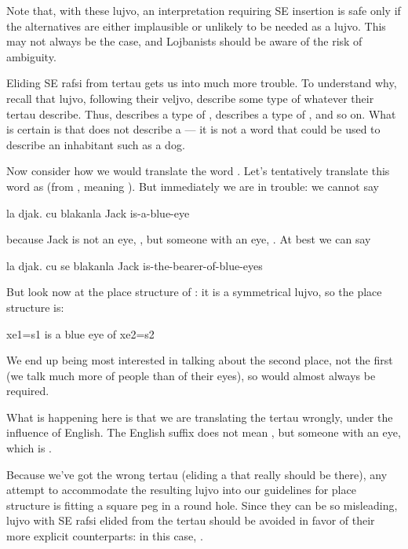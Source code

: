 Note that, with these lujvo, an interpretation requiring SE
    insertion is safe only if the alternatives are either
    implausible or unlikely to be needed as a lujvo. This may not
    always be the case, and Lojbanists should be aware of the risk
    of ambiguity.



Eliding SE rafsi from tertau gets us into much more trouble.
    To understand why, recall that lujvo, following their veljvo,
    describe some type of whatever their tertau describe. Thus,
     describes a type of ,  describes
    a type of , and so on. What is certain is that
     does not describe a  --- it is not a
    word that could be used to describe an inhabitant such as a
    dog.

Now consider how we would translate the word .
    Let's tentatively translate this word as  (from
    , meaning ). But immediately we are
    in trouble: we cannot say
\begin{example}
la djak. cu blakanla\n
Jack is-a-blue-eye
\end{example}

{\noindent}because Jack is not an eye, , but someone with an eye,
    . At best we can say
\begin{example}
la djak. cu se blakanla\n
Jack is-the-bearer-of-blue-eyes
\end{example}

But look now at the place structure of : it is a
    symmetrical lujvo, so the place structure is:
\begin{example}
xe1=s1 is a blue eye of xe2=s2
\end{example}

We end up being most interested in talking about the second
    place, not the first (we talk much more of people than of their
    eyes), so  would almost always be required.

What is happening here is that we are translating the tertau
    wrongly, under the influence of English. The English suffix
     does not mean , but someone with an eye, which
    is .

Because we've got the wrong tertau (eliding a  that
    really should be there), any attempt to accommodate the
    resulting lujvo into our guidelines for place structure is
    fitting a square peg in a round hole. Since they can be so
    misleading, lujvo with SE rafsi elided from the tertau should
    be avoided in favor of their more explicit counterparts: in
    this case, .



